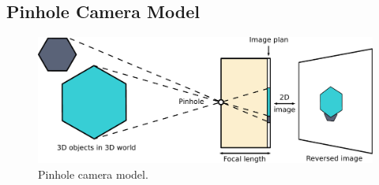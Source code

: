 \subsection{Pinhole Camera Model}%
\label{sub:pinhole}


\begin{figure}[h]
\centering
\includegraphics[width=\textwidth]{assets/img/pinhole.pdf}
\caption{Pinhole camera model.}%
\label{fig:pinhole_camera}
\end{figure}

